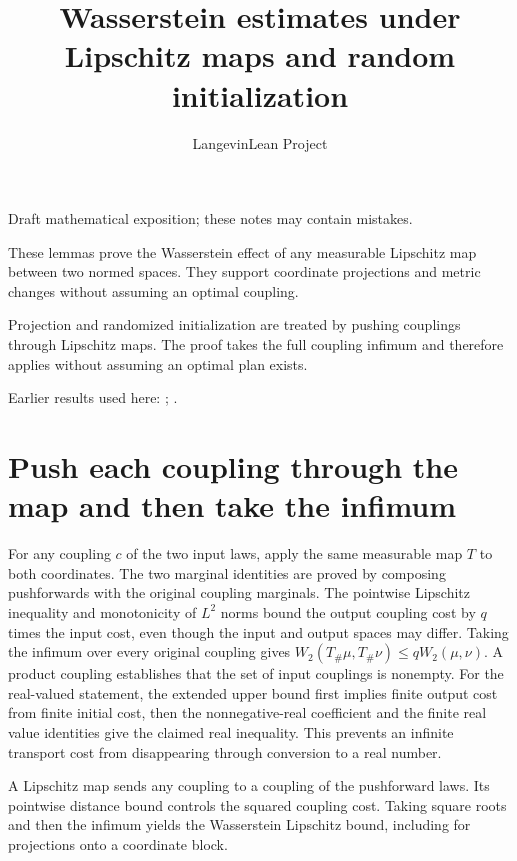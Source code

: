 \documentclass[11pt,a4paper]{article}
\title{\texorpdfstring{Wasserstein estimates under Lipschitz maps and random initialization}{Wasserstein estimates under Lipschitz maps and random initialization}}
\author{LangevinLean Project}
\date{}
\begin{document}
\maketitle
Draft mathematical exposition; these notes may contain mistakes.


These lemmas prove the Wasserstein effect of any measurable Lipschitz map between two normed spaces. They support coordinate projections and metric changes without assuming an optimal coupling.



Projection and randomized initialization are treated by pushing couplings through Lipschitz maps. The proof takes the full coupling infimum and therefore applies without assuming an optimal plan exists.



Earlier results used here: \cite[Section~3.18]{LangevinLean2026ULASC}; \cite[Section~3.22]{LangevinLean2026ULASC}.

\section{\texorpdfstring{Push each coupling through the map and then take the infimum}{Push each coupling through the map and then take the infimum}}


For any coupling \(c\) of the two input laws, apply the same measurable map \(T\) to both coordinates. The two marginal identities are proved by composing pushforwards with the original coupling marginals. The pointwise Lipschitz inequality and monotonicity of \(L^{2}\) norms bound the output coupling cost by \(q\) times the input cost, even though the input and output spaces may differ. Taking the infimum over every original coupling gives \(W_2(T_\#\mu,T_\#\nu)\le qW_2(\mu,\nu)\). A product coupling establishes that the set of input couplings is nonempty. For the real-valued statement, the extended upper bound first implies finite output cost from finite initial cost, then the nonnegative-real coefficient and the finite real value identities give the claimed real inequality. This prevents an infinite transport cost from disappearing through conversion to a real number.



A Lipschitz map sends any coupling to a coupling of the pushforward laws. Its pointwise distance bound controls the squared coupling cost. Taking square roots and then the infimum yields the Wasserstein Lipschitz bound, including for projections onto a coordinate block.
\end{document}
